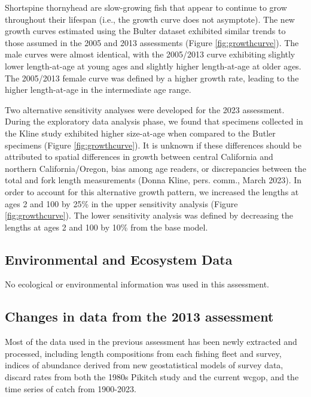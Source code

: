 \documentclass[11pt,
  english,
  letterpaper,
]{article}
\begin{document}
Shortspine thornyhead are slow-growing fish that appear to continue to grow throughout their lifespan (i.e., the growth curve does not asymptote). The new growth curves estimated using the Bulter dataset exhibited similar trends to those assumed in the 2005 and 2013 assessments (Figure \ref{fig:growthcurve}). The male curves were almost identical, with the 2005/2013 curve exhibiting slightly lower length-at-age at young ages and slightly higher length-at-age at older ages. The 2005/2013 female curve was defined by a higher growth rate, leading to the higher length-at-age in the intermediate age range.

Two alternative sensitivity analyses were developed for the 2023 assessment. During the exploratory data analysis phase, we found that specimens collected in the Kline study exhibited higher size-at-age when compared to the Butler specimens (Figure \ref{fig:growthcurve}). It is unknown if these differences should be attributed to spatial differences in growth between central California and northern California/Oregon, bias among age readers, or discrepancies between the total and fork length measurements (Donna Kline, pers. comm., March 2023). In order to account for this alternative growth pattern, we increased the lengths at ages 2 and 100 by 25\% in the upper sensitivity analysis (Figure \ref{fig:growthcurve}). The lower sensitivity analysis was defined by decreasing the lengths at ages 2 and 100 by 10\% from the base model.

\hypertarget{environmental-and-ecosystem-data}{%
\subsection{Environmental and Ecosystem Data}\label{environmental-and-ecosystem-data}}

No ecological or environmental information was used in this assessment.

\hypertarget{changes-in-data-from-the-2013-assessment}{%
\subsection{Changes in data from the 2013 assessment}\label{changes-in-data-from-the-2013-assessment}}

Most of the data used in the previous assessment has been newly extracted and processed, including length compositions from each fishing fleet and survey, indices of abundance derived from new geostatistical models of survey data, discard rates from both the 1980s Pikitch study and the current \gls{wcgop}, and the time series of catch from 1900-2023.
\end{document}

